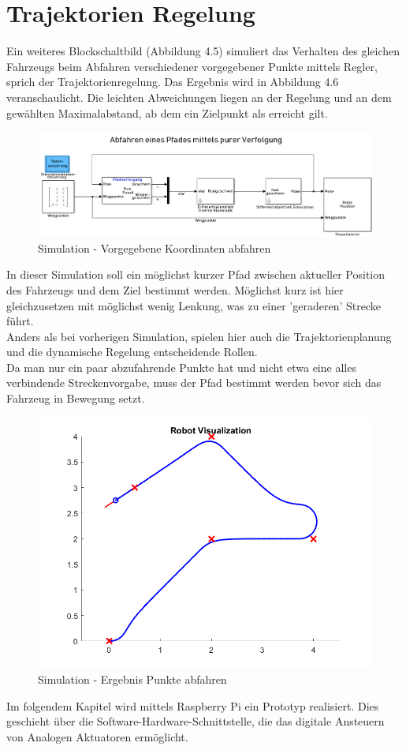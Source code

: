 \section{Trajektorien Regelung}
Ein weiteres Blockschaltbild (Abbildung 4.5) simuliert das Verhalten des gleichen Fahrzeugs beim Abfahren verschiedener vorgegebener Punkte mittels Regler, sprich der Trajektorienregelung. Das Ergebnis wird in Abbildung 4.6 veranschaulicht. Die leichten Abweichungen liegen an der Regelung und an dem gewählten Maximalabstand, ab dem ein Zielpunkt als erreicht gilt.
\begin{figure}[htb]
  \centering  
  \includegraphics[scale=1.4]{img/einfachesmodellpunkteanfahrensimulation.png}
  \caption{Simulation - Vorgegebene Koordinaten abfahren}
  \label{fig:starwars}
\end{figure}

In dieser Simulation soll ein möglichst kurzer Pfad zwischen aktueller Position des Fahrzeugs und dem Ziel bestimmt werden. Möglichst kurz ist hier gleichzusetzen mit möglichst wenig Lenkung, was zu einer 'geraderen' Strecke führt. \\
Anders als bei vorherigen Simulation, spielen hier auch die Trajektorienplanung und die dynamische Regelung entscheidende Rollen. \\
Da man nur ein paar abzufahrende Punkte hat und nicht etwa eine alles verbindende Streckenvorgabe, muss der Pfad bestimmt werden bevor sich das Fahrzeug in Bewegung setzt.  

\begin{figure}[H]
  \centering  
  \includegraphics[scale=0.7]{img/simulationsergebnis1.png}
  \caption{Simulation - Ergebnis Punkte abfahren}
  \label{fig:starwars}
\end{figure}

Im folgendem Kapitel wird mittels Raspberry Pi ein Prototyp realisiert. Dies geschieht über die Software-Hardware-Schnittstelle, die das digitale Ansteuern von Analogen Aktuatoren ermöglicht.




